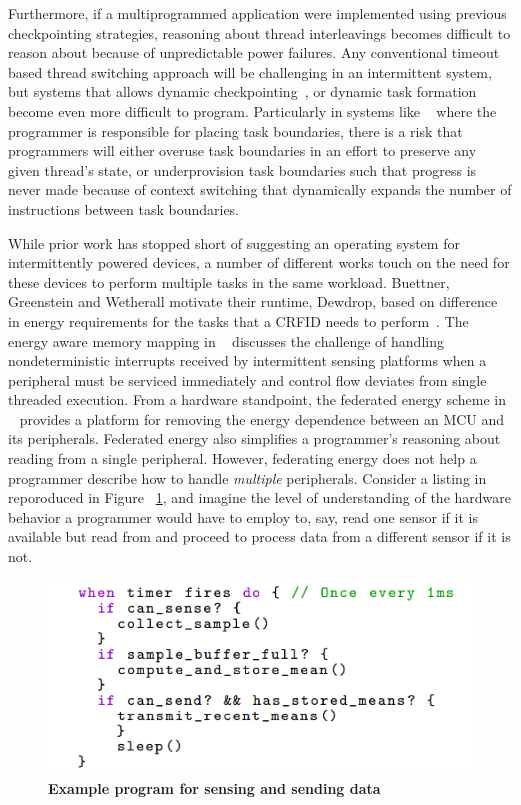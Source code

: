\documentclass[11pt]{sensys-proc}
\begin{document}
Furthermore, if a multiprogrammed application were implemented using previous
checkpointing strategies, reasoning about thread interleavings becomes  difficult to
reason about because of unpredictable power failures. Any conventional timeout based
thread switching approach will be challenging in an intermittent system, but systems that
allows dynamic checkpointing~\cite{hibernus}, or dynamic task formation~\cite{Dino} become
even more difficult to program. Particularly in systems like ~\cite{Dino} where the
programmer is responsible for placing task boundaries, there is a risk that programmers
will either overuse task boundaries in an effort to preserve any given thread's state, or
underprovision task boundaries such that progress is never made because of context
switching that dynamically expands the number of instructions between task boundaries.

While prior work has stopped short of suggesting an operating system for intermittently
powered devices, a number of different works touch on the need for these devices to
perform multiple tasks in the same workload. Buettner, Greenstein and Wetherall motivate
their runtime, Dewdrop, based on difference in energy requirements for the tasks that a
CRFID needs to perform~\cite{dewdrop}. The energy aware memory mapping in ~\cite{Aware}
discusses the challenge of handling nondeterministic interrupts received by intermittent
sensing platforms when a peripheral must be serviced immediately and control flow deviates
from single threaded execution. From a hardware standpoint, the federated energy scheme in
~\cite{ufop} provides a platform for removing the energy dependence between an MCU and its
peripherals. Federated energy also simplifies a programmer's reasoning about reading from
a single peripheral. However, federating energy does not help a programmer describe how to
handle {\em multiple} peripherals. Consider a listing in
~\cite{ufop} reporoduced in Figure ~\ref{fig:copy}, and imagine the level of understanding
of the hardware behavior a programmer would have to employ to, say, read one sensor if it
is available but read from and proceed to process data from a different sensor if it is not.

\begin{figure}[h]
  \centering
  \includegraphics[width=0.99\columnwidth]{figs/listing}
  \caption{{\bf Example program for sensing and sending data}}
  \label{fig:copy}
\end{figure}
\end{document}
